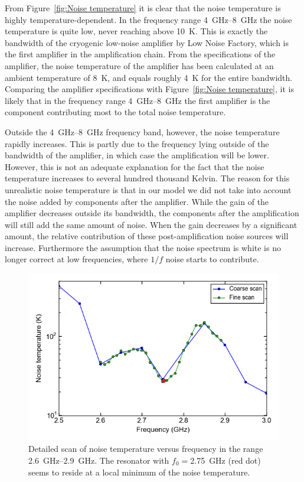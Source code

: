 \documentclass[12pt]{report}
\begin{document}
From Figure~\ref{fig:Noise temperature} it is clear that the noise temperature is highly temperature-dependent. In the frequency range \SIrange{4}{8}{\giga \hertz} the noise temperature is quite low, never reaching above \SI{10}{\kelvin}. This is exactly the bandwidth of the cryogenic low-noise amplifier by Low Noise Factory, which is the first amplifier in the amplification chain. From the specifications of the amplifier, the noise temperature of the amplifier has been calculated at an ambient temperature of \SI{8}{\kelvin}, and equals roughly \SI{4}{\kelvin} for the entire bandwidth. Comparing the amplifier specifications with Figure~\ref{fig:Noise temperature}, it is likely that in the frequency range \SIrange{4}{8}{\giga \hertz} the first amplifier is the component contributing most to the total noise temperature.

Outside the \SIrange{4}{8}{\giga \hertz} frequency band, however, the noise temperature rapidly increases. This is partly due to the frequency lying outside of the bandwidth of the amplifier, in which case the amplification will be lower. However, this is not an adequate explanation for the fact that the noise temperature increases to several hundred thousand Kelvin. The reason for this unrealistic noise temperature is that in our model we did not take into account the noise added by components after the amplifier. While the gain of the amplifier decreases outside its bandwidth, the components after the amplification will still add the same amount of noise. When the gain decreases by a significant amount, the relative contribution of these post-amplification noise sources will increase. Furthermore the assumption that the noise spectrum is white is no longer correct at low frequencies, where $1/f$ noise starts to contribute.

\begin{figure}[h]
    \centering
    \includegraphics[width = .6\linewidth]{Figures/noise_temperature_versus_power_detailed.png}
    \caption{Detailed scan of noise temperature versus frequency in the range \SIrange{2.6}{2.9}{\giga \hertz}. The resonator with $f_0 = $\SI{2.75}{\giga \hertz} (red dot) seems to reside at a local minimum of the noise temperature.}
    \label{fig:noise temperature 2GHz}
\end{figure}
\end{document}
